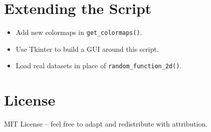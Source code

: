 \documentclass[12pt]{article}
\begin{document}
\section{Extending the Script}
\begin{itemize}[nosep]
  \item Add new colormaps in \texttt{get\_colormaps()}.
  \item Use Tkinter to build a GUI around this script.
  \item Load real datasets in place of \texttt{random\_function\_2d()}.
\end{itemize}

\section*{License}
MIT License – feel free to adapt and redistribute with attribution.
\end{document}
